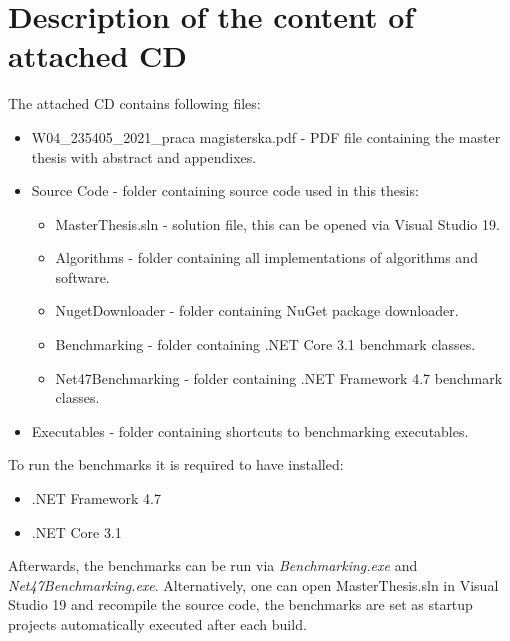 \chapter{Description of the content of attached CD}

The attached CD contains following files:
\begin{itemize}
	\item W04\_235405\_2021\_praca magisterska.pdf - PDF file containing the master thesis with abstract and appendixes.
	\item Source Code - folder containing source code used in this thesis:
	\begin{itemize}
		\item MasterThesis.sln - solution file, this can be opened via Visual Studio 19.
		\item Algorithms - folder containing all implementations of algorithms and software.
		\item NugetDownloader - folder containing NuGet package downloader.
		\item Benchmarking - folder containing .NET Core 3.1 benchmark classes.
		\item Net47Benchmarking - folder containing .NET Framework 4.7 benchmark classes.
	\end{itemize}
	\item Executables - folder containing shortcuts to benchmarking executables.
\end{itemize}

To run the benchmarks it is required to have installed:
\begin{itemize}
	\item .NET Framework 4.7
	\item .NET Core 3.1
\end{itemize}

Afterwards, the benchmarks can be run via \emph{Benchmarking.exe} and \emph{Net47Benchmarking.exe}.
Alternatively, one can open MasterThesis.sln in Visual Studio 19 and recompile the source code,
the benchmarks are set as startup projects automatically executed after each build.
